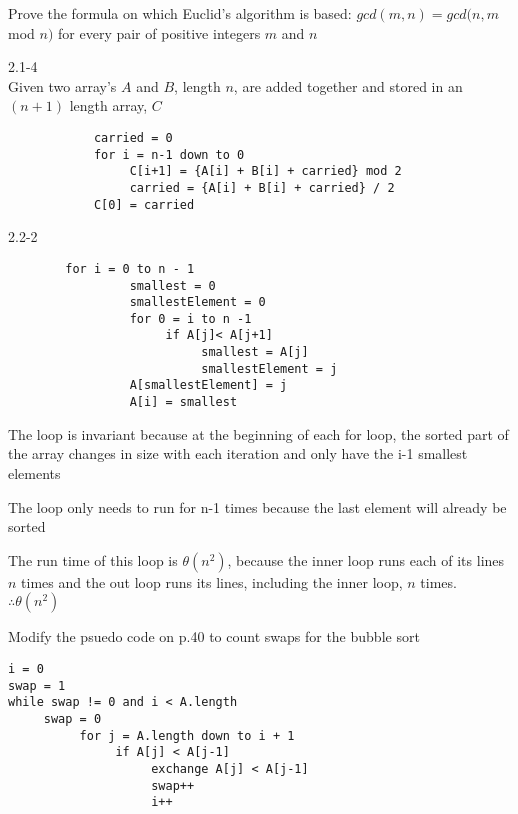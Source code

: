 \documentclass[12pt,largemargins]{homework}
\begin{document}
  \question
    \begin{arabicparts}

      \item
        Prove the formula on which Euclid's algorithm is based:
        $gcd(m,n)=gcd(n,m$ mod $ n)$ for every pair of positive integers $m$ and $n$

\newpage
    
      \item
        2.1-4\\ Given two array's $A$ and $B$, length $n$, are added together and stored in an $(n+1)$ length array, $C$
        \begin{verbatim}
			carried = 0 
			for i = n-1 down to 0 
			     C[i+1] = {A[i] + B[i] + carried} mod 2
			     carried = {A[i] + B[i] + carried} / 2 
			C[0] = carried
        \end{verbatim}
       		

		\item
		2.2-2
		\begin{alphaparts}
		\item
		\begin{verbatim}
		for i = 0 to n - 1
			     smallest = 0
			     smallestElement = 0
			     for 0 = i to n -1
			          if A[j]< A[j+1]
			               smallest = A[j]
			               smallestElement = j
			     A[smallestElement] = j
			     A[i] = smallest
		\end{verbatim}
		\item
		The loop is invariant because at the beginning of each for loop, the 
		sorted part of the array changes in size with each iteration and only have the i-1 smallest elements 
		\item
		The loop only needs to run for n-1 times because the last element will already be sorted
		\item
		The run time of this loop is $\theta (n^2)$, because the inner loop runs each of its lines $n$ times and the out loop runs its lines, including the inner loop, $n$ times. $\therefore \theta(n^2)$

		\end{alphaparts}
\end{arabicparts}

\newpage
\question
Modify the psuedo code on p.40 to count swaps for the bubble sort
\begin{verbatim}
i = 0
swap = 1
while swap != 0 and i < A.length
     swap = 0
          for j = A.length down to i + 1
               if A[j] < A[j-1]
                    exchange A[j] < A[j-1]
                    swap++
                    i++ 
\end{verbatim}
\end{document}
